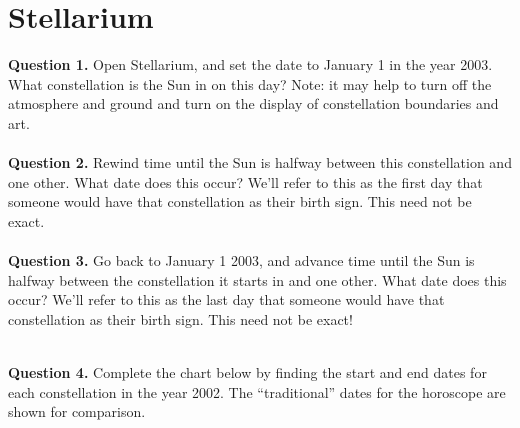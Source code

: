 \documentclass[11pt]{article}
\begin{document}

\newpage
\section{Stellarium}

\textbf{Question 1.} Open Stellarium, and set the date to January 1 in the year 2003. What constellation is the Sun in on this day? Note: it may help to turn off the atmosphere and ground and turn on the display of constellation boundaries and art.\\

\vspace{1.5cm}
\hrulefill\\

\textbf{Question 2.} Rewind time until the Sun is halfway between this constellation and one other. What date does this occur? We'll refer to this as the first day that someone would have that constellation as their birth sign. This need not be exact.\\

\vspace{1.5cm}
\hrulefill\\

\textbf{Question 3.} Go back to January 1 2003, and advance time until the Sun is halfway between the constellation it starts in and one other. What date does this occur? We'll refer to this as the last day that someone would have that constellation as their birth sign. This need not be exact!\\

\vspace{1.5cm}
\hrulefill\\

\newpage

\textbf{Question 4.} Complete the chart below by finding the start and end dates for each constellation in the year 2002. The ``traditional'' dates for the horoscope are shown for comparison.\\
\end{document}

